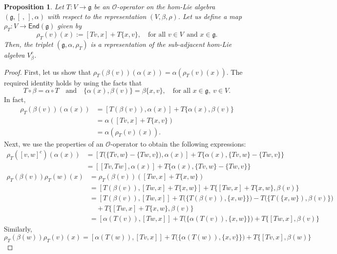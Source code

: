 \documentclass[a4paper,11pt]{amsart}
\theoremstyle{plain}
\newtheorem{proposition}[theorem]{Proposition}
\theoremstyle{definition}
\theoremstyle{remark}
\numberwithin{equation}{section}
\begin{document}
\begin{proposition}\label{rep associated to O-operator}
Let $T:V\rightarrow \mathfrak{g}$ be an $\mathcal{O}$-operator on the hom-Lie algebra $(\mathfrak{g},[~,~],\alpha)$ with respect to the representation $(V,\beta, \rho)$. Let us define a map $\rho_T:V\rightarrow \mathsf{End}(\mathfrak{g})$ given by
$$\rho_T(v)(x):=[Tv,x]+T\{x,v\},\quad \mbox{for all  }v\in V~~\mbox{and  } x\in\mathfrak{g}.$$
Then, the triplet $(\mathfrak{g},\alpha,\rho_T)$ is a representation of the sub-adjacent hom-Lie algebra $V^c_{\beta}$.
\end{proposition}
\begin{proof}
First, let us show that $\rho_T(\beta(v))(\alpha(x))= \alpha(\rho_T(v)(x))$. The required identity holds by using the facts that 
$$T\circ \beta=\alpha\circ T~~~\mbox{ and }~~~\{\alpha(x),\beta(v)\}=\beta\{x,v\},\quad\mbox{for all } x\in\mathfrak{g},~v\in V.$$ 
In fact,
\begin{align*}
\rho_T(\beta(v))(\alpha(x))&=[T(\beta (v)),\alpha (x)]+T\{\alpha(x),\beta(v)\}\\
&=\alpha([Tv,x]+T\{x,v\})\\
&=\alpha(\rho_T(v)(x)).
\end{align*}
Next, we use the properties of an $\mathcal{O}$-operator  to obtain the following expressions:
\begin{align}\label{rep:eq1}
\rho_T([v,w]^c)(\alpha(x))&=[T\big(\{Tv,w\}-\{Tw,v\}\big),\alpha(x)]+T\{\alpha(x),\{Tv,w\}-\{Tw,v\}\}\\\nonumber
&=[[Tv,Tw],\alpha(x)]+T\{\alpha(x),\{Tv,w\}-\{Tw,v\}\}
\end{align}
\begin{align}\label{rep:eq2}
\rho_T(\beta(v))\rho_T(w)(x)&=\rho_T(\beta(v))([Tw,x]+T\{x,w\})\\\nonumber
&=[T(\beta(v)),[Tw,x]+T\{x,w\}]+T\{[Tw,x]+T\{x,w\},\beta(v)\}\\\nonumber
&=[T(\beta(v)),[Tw,x]] + T\big(\{T(\beta(v)),\{x,w\}\}\big)-T\big(\{T(\{x,w\}),\beta(v)\}\big)\\\nonumber
&\quad+T\{[Tw,x]+T\{x,w\},\beta(v)\}\\\nonumber
&=[\alpha(T(v)),[Tw,x]]+T\big(\{\alpha(T(v)),\{x,w\}\}\big)+T\{[Tw,x],\beta(v)\}
\end{align}
Similarly,
\begin{equation}\label{rep:eq3}
\rho_T(\beta(w))\rho_T(v)(x)=[\alpha(T(w)),[Tv,x]]+T\big(\{\alpha(T(w)),\{x,v\}\}\big) +T\{[Tv,x],\beta(w)\}
\end{equation}


\end{proof}
\end{document}
